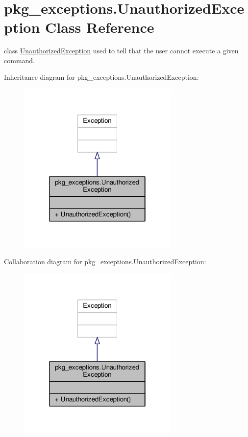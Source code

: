 \hypertarget{classpkg__exceptions_1_1UnauthorizedException}{\section{pkg\-\_\-exceptions.\-Unauthorized\-Exception Class Reference}
\label{classpkg__exceptions_1_1UnauthorizedException}
}


class \hyperlink{classpkg__exceptions_1_1UnauthorizedException}{Unauthorized\-Exception} used to tell that the user cannot execute a given command.  




Inheritance diagram for pkg\-\_\-exceptions.\-Unauthorized\-Exception\-:
\nopagebreak
\begin{figure}[H]
\begin{center}
\leavevmode
\includegraphics[width=226pt]{classpkg__exceptions_1_1UnauthorizedException__inherit__graph}
\end{center}
\end{figure}


Collaboration diagram for pkg\-\_\-exceptions.\-Unauthorized\-Exception\-:
\nopagebreak
\begin{figure}[H]
\begin{center}
\leavevmode
\includegraphics[width=226pt]{classpkg__exceptions_1_1UnauthorizedException__coll__graph}
\end{center}
\end{figure}
